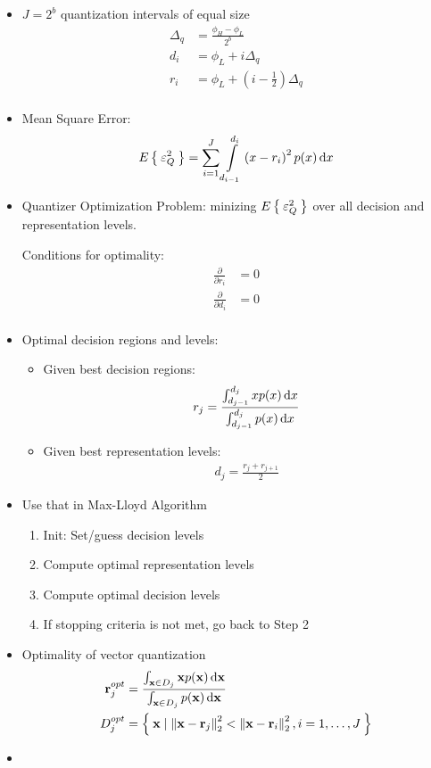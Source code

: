 \begin{itemize}
	\item
		$J = 2^b$ quantization intervals of equal size
		\begin{align*}
			\Delta_q &= \frac{\phi_H - \phi_L}{2^b}\\
			d_i &= \phi_L + i\Delta_q\\
			r_i &= \phi_L + \left(i-\frac12\right)\Delta_q\\
		\end{align*}
	\item
		Mean Square Error:
		\begin{align*}
			E\Set{\varepsilon_Q^2} = \sum_{i=1}^J \intop_{d_{i - 1}}^{d_i} \left(x - r_i\right)^2 p(x) \id x
		\end{align*}
	\item
		Quantizer Optimization Problem: minizing $E\Set{\varepsilon_Q^2}$ over all decision and representation levels.

		Conditions for optimality:
		\begin{align*}
				\frac\partial{\partial r_i} &= 0\\
				\frac\partial{\partial d_i} &= 0\\
		\end{align*}
	\item
		Optimal decision regions and levels:
		\begin{itemize}
			\item
				Given best decision regions:
				\begin{align*}
					r_j = \frac{\int_{d_{j-1}}^{d_j} x p(x) \, \mathrm{d} x}{\int_{d_{j-1}}^{d_j} p(x) \, \mathrm{d} x}
				\end{align*}
			\item
				Given best representation levels:
				\begin{align*}
					d_j = \frac{r_j + r_{j+1}}2
				\end{align*}
		\end{itemize}
	\item
		Use that in Max-Lloyd Algorithm
		\begin{enumerate}
			\item
				Init: Set/guess decision levels
			\item
				Compute optimal representation levels
			\item
				Compute optimal decision levels
			\item
				If stopping criteria is not met, go back to Step 2
		\end{enumerate}
	\item
		Optimality of vector quantization
		\begin{align*}
			\mathbf{r}_j^{opt} &= \frac{\int_{\mathbf{x} \in D_j} \mathbf{x} p(\mathbf{x}) \, \mathrm{d} \mathbf{x}}{\int_{\mathbf{x} \in D_j} p(\mathbf{x}) \, \mathrm{d} \mathbf{x}}\\
			D_j^{opt} &= \Set{ \mathbf{x} \mid   \left \Vert \mathbf{x} - \mathbf{r}_j \right \Vert _2^2 <  \left \Vert \mathbf{x} - \mathbf{r}_i \right \Vert _2^2, i  = 1, \dots, J}
		\end{align*}
	\item

\end{itemize}

